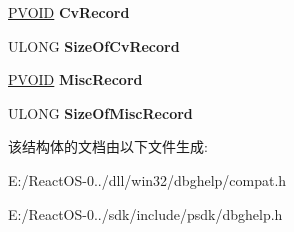 \begin{DoxyCompactItemize}
\item 
\mbox{\label{struct___m_i_n_i_d_u_m_p___m_o_d_u_l_e___c_a_l_l_b_a_c_k_a5efd7a79d45c86ed63cc8428cdfe65bd}} 
\hyperlink{interfacevoid}{P\+V\+O\+ID} {\bfseries Cv\+Record}
\item 
\mbox{\label{struct___m_i_n_i_d_u_m_p___m_o_d_u_l_e___c_a_l_l_b_a_c_k_ad6a94a6648d920d5c97bccb5ff5e99f1}} 
U\+L\+O\+NG {\bfseries Size\+Of\+Cv\+Record}
\item 
\mbox{\label{struct___m_i_n_i_d_u_m_p___m_o_d_u_l_e___c_a_l_l_b_a_c_k_a77789d0184083aa756d40eee834cb980}} 
\hyperlink{interfacevoid}{P\+V\+O\+ID} {\bfseries Misc\+Record}
\item 
\mbox{\label{struct___m_i_n_i_d_u_m_p___m_o_d_u_l_e___c_a_l_l_b_a_c_k_ab42faaa1128224b9fefcd7b9eff0b90b}} 
U\+L\+O\+NG {\bfseries Size\+Of\+Misc\+Record}
\end{DoxyCompactItemize}


该结构体的文档由以下文件生成\+:\begin{DoxyCompactItemize}
\item 
E\+:/\+React\+O\+S-\/0../dll/win32/dbghelp/compat.\+h\item 
E\+:/\+React\+O\+S-\/0../sdk/include/psdk/dbghelp.\+h\end{DoxyCompactItemize}
